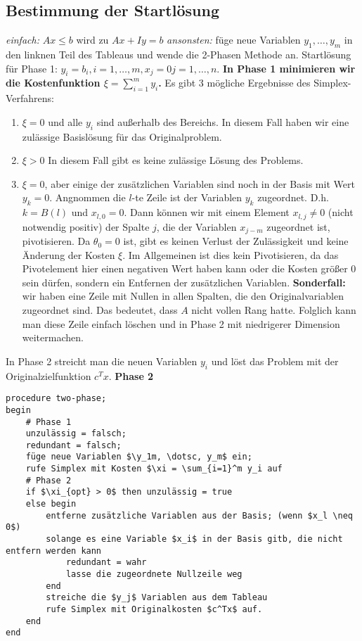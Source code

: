 \subsection{Bestimmung der Startlösung}
\emph{einfach:} $Ax \leq b$ wird zu $Ax + Iy = b$ \newline
\emph{ansonsten:} füge neue Variablen $y_1,\dotsc, y_m$ in den linknen Teil des Tableaus und wende die 2-Phasen Methode an.
Startlösung für Phase 1: $y_i = b_i, i=1,\dotsc,m, x_j =0 j=1,\dotsc,n$.\newline
\textbf{In Phase 1 minimieren wir die Kostenfunktion $\xi = \sum_{i=1}^m y_i$.}\newline
Es gibt 3 mögliche Ergebnisse des Simplex-Verfahrens:
\begin{enumerate}[Fall 1)]
\item $\xi =0$ und alle $y_i$ sind außerhalb des Bereichs.
In diesem Fall haben wir eine zulässige Basislösung für das Originalproblem.
\item $\xi > 0$
In diesem Fall gibt es keine zulässige Lösung des Problems.
\item $\xi = 0$, aber einige der zusätzlichen Variablen sind noch in der Basis mit Wert $y_k = 0$.
Angnommen die $l$-te Zeile ist der Variablen $y_k$ zugeordnet. D.h. $k = B(l)$ und $x_{l,0} = 0$.
Dann können wir mit einem Element $x_{l,j} \neq 0$ (nicht notwendig positiv) der Spalte $j$, die der Variablen
$x_{j-m}$ zugeordnet ist, pivotisieren.
Da $\theta_0 = 0$ ist, gibt es keinen Verlust der Zulässigkeit und keine Änderung der Kosten $\xi$.
Im Allgemeinen ist dies kein Pivotisieren, da das Pivotelement hier einen negativen Wert haben kann oder
die Kosten größer $0$ sein dürfen, sondern ein Entfernen der zusätzlichen Variablen.\newline
\textbf{Sonderfall:} wir haben eine Zeile mit Nullen in allen Spalten, die den Originalvariablen zugeordnet sind.
Das bedeutet, dass $A$ nicht vollen Rang hatte. Folglich kann man diese Zeile einfach löschen und in Phase 2 mit
niedrigerer Dimension weitermachen.
\end{enumerate}
In Phase 2 streicht man die neuen Variablen $y_i$ und löst das Problem mit der Originalzielfunktion $c^Tx$.
\newline
\textbf{Phase 2}\newline
\begin{verbatim}
procedure two-phase;
begin
	# Phase 1
	unzulässig = falsch;
	redundant = falsch;
	füge neue Variablen $\y_1m, \dotsc, y_m$ ein;
	rufe Simplex mit Kosten $\xi = \sum_{i=1}^m y_i auf
	# Phase 2
	if $\xi_{opt} > 0$ then unzulässig = true
	else begin
		entferne zusätzliche Variablen aus der Basis; (wenn $x_l \neq 0$)
		solange es eine Variable $x_i$ in der Basis gitb, die nicht entfern werden kann
			redundant = wahr
			lasse die zugeordnete Nullzeile weg
		end
		streiche die $y_j$ Variablen aus dem Tableau
		rufe Simplex mit Originalkosten $c^Tx$ auf.
	end
end	
\end{verbatim}

